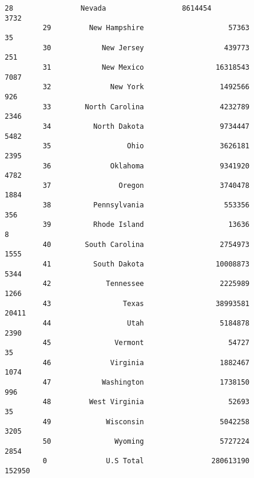 \documentclass[11pt]{article}
\begin{document}
\begin{Verbatim}[commandchars=\\\{\}]
         28                Nevada                  8614454                    3732   
         29         New Hampshire                    57363                      35   
         30            New Jersey                   439773                     251   
         31            New Mexico                 16318543                    7087   
         32              New York                  1492566                     926   
         33        North Carolina                  4232789                    2346   
         34          North Dakota                  9734447                    5482   
         35                  Ohio                  3626181                    2395   
         36              Oklahoma                  9341920                    4782   
         37                Oregon                  3740478                    1884   
         38          Pennsylvania                   553356                     356   
         39          Rhode Island                    13636                       8   
         40        South Carolina                  2754973                    1555   
         41          South Dakota                 10008873                    5344   
         42             Tennessee                  2225989                    1266   
         43                 Texas                 38993581                   20411   
         44                  Utah                  5184878                    2390   
         45               Vermont                    54727                      35   
         46              Virginia                  1882467                    1074   
         47            Washington                  1738150                     996   
         48         West Virginia                    52693                      35   
         49             Wisconsin                  5042258                    3205   
         50               Wyoming                  5727224                    2854   
         0              U.S Total                280613190                  152950   
         

\end{Verbatim}
\end{document}
